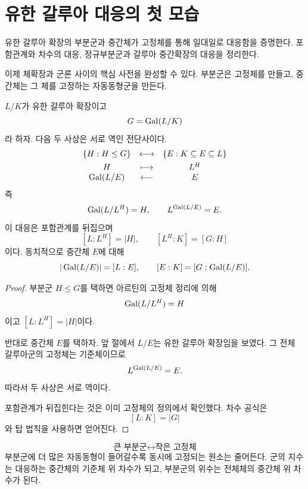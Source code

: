 \clearpage
\section{유한 갈루아 대응의 첫 모습}
\label{sec:finite-galois-correspondence}

\begin{learninggoal}
유한 갈루아 확장의 부분군과 중간체가 고정체를 통해 일대일로 대응함을 증명한다. 포함관계와 차수의 대응, 정규부분군과 갈루아 중간확장의 대응을 정리한다.
\end{learninggoal}

이제 체확장과 군론 사이의 핵심 사전을 완성할 수 있다. 부분군은 고정체를 만들고, 중간체는 그 체를 고정하는 자동동형군을 만든다.

\begin{theorem}
$L/K$가 유한 갈루아 확장이고
\[
  G=\operatorname{Gal}(L/K)
\]
라 하자. 다음 두 사상은 서로 역인 전단사이다.
\[
\begin{array}{ccc}
\{H:H\le G\}
&\longleftrightarrow&
\{E:K\subseteq E\subseteq L\}\\[4pt]
H&\longmapsto&L^H\\
\operatorname{Gal}(L/E)&\longleftarrow&E
\end{array}
\]
즉
\[
  \operatorname{Gal}(L/L^H)=H,
  \qquad
  L^{\operatorname{Gal}(L/E)}=E.
\]
이 대응은 포함관계를 뒤집으며
\[
  [L:L^H]=|H|,
  \qquad
  [L^H:K]=[G:H]
\]
이다. 동치적으로 중간체 $E$에 대해
\[
  |\operatorname{Gal}(L/E)|=[L:E],
  \qquad
  [E:K]=[G:\operatorname{Gal}(L/E)].
\]
\end{theorem}

\begin{proof}
부분군 $H\le G$를 택하면 아르틴의 고정체 정리에 의해
\[
  \operatorname{Gal}(L/L^H)=H
\]
이고 $[L:L^H]=|H|$이다.

반대로 중간체 $E$를 택하자. 앞 절에서 $L/E$는 유한 갈루아 확장임을 보였다. 그 전체 갈루아군의 고정체는 기준체이므로
\[
  L^{\operatorname{Gal}(L/E)}=E.
\]
따라서 두 사상은 서로 역이다.

포함관계가 뒤집힌다는 것은 이미 고정체의 정의에서 확인했다. 차수 공식은
\[
  [L:K]=|G|
\]
와 탑 법칙을 사용하면 얻어진다.
\end{proof}

\begin{keyidea}
\[
  \boxed{
  \text{큰 부분군}
  \longleftrightarrow
  \text{작은 고정체}
  }
\]
부분군에 더 많은 자동동형이 들어갈수록 동시에 고정되는 원소는 줄어든다. 군의 지수는 대응하는 중간체의 기준체 위 차수가 되고, 부분군의 위수는 전체체의 중간체 위 차수가 된다.
\end{keyidea}

